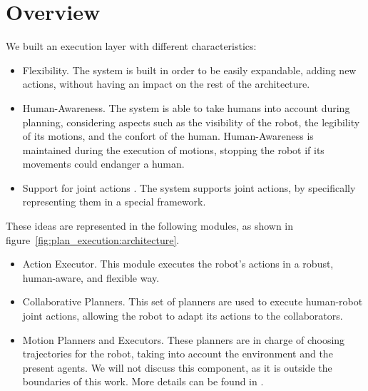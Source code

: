 \section{Overview}
\label{sec:plan_execution-overview}

We built an execution layer with different characteristics:
\begin{itemize}
\item Flexibility. The system is built in order to be easily expandable, adding new actions, without having an impact on the rest of the architecture.
\item Human-Awareness. The system is able to take humans into account during planning, considering aspects such as the visibility of the robot, the legibility of its motions, and the confort of the human. Human-Awareness is maintained during the execution of motions, stopping the robot if its movements could endanger a human.
\item Support for joint actions . The system supports joint actions, by specifically representing them in a special framework.
\end{itemize}

These ideas are represented in the following modules, as shown in figure~\ref{fig:plan_execution:architecture}.
\begin{itemize}
	\item Action Executor. This module executes the robot's actions in a robust, human-aware, and flexible way.
	\item Collaborative Planners. This set of planners are used to execute human-robot joint actions, allowing the robot to adapt its actions to the collaborators.
	\item Motion Planners and Executors. These planners are in charge of choosing trajectories for the robot, taking into account the environment and the present agents. We will not discuss this component, as it is outside the boundaries of this work. More details can be found in \cite{Sisbot2008,Mainprice2011,Pandey2010}.
\end{itemize}


